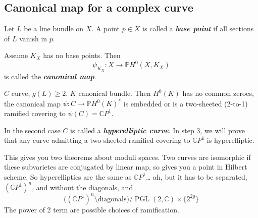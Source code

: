 \subsection{Canonical map for a complex curve}

\begin{defn}\leavevmode
	Let $L$ be a line bundle on $X$. A point $p \in X$ is called a \textit{\textbf{base point}} if all sections of $L$ vanish in $p$.
\end{defn}

\begin{defn}\leavevmode
	Assume $K_X$ has no base points. Then
	\[\psi_{K_X}:X\longrightarrow \mathbb{P}H^{0}(X,K_X)\]
	is called the \textit{\textbf{canonical map}}.
\end{defn}

\begin{thm}\leavevmode
	$C$ curve, $g(L)\geq 2$. $K$ canonical bundle. Then  $H^{0}(K)$ has no common zeroes, the canonical map $\psi:C\longrightarrow \mathbb{P}H^{0}(K)^*$ is embedded or is a two-sheeted (2-to-1) ramified covering to $ \psi(C)=\mathbb{C}P^{1}$.
\end{thm}

\begin{remark}
	In the second case $C$ is called a \textit{\textbf{hyperelliptic curve}}. In step 3, we will prove that any curve admitting a two sheeted ramified covering to  $\mathbb{C}P^{1}$ is hyperelliptic.

	This gives you two theorems about moduli spaces. Two curves are isomorphic if these subvarietes are conjugated by linear map, so gives you a point in Hilbert scheme. So hyperelliptics are the same as $\mathbb{C}P^{1}$… ah, but it has to be separated, $(\mathbb{C}P^{1})^n$, and without the diagonals, and 
	\[\Big((\mathbb{C}P^{1})^n\setminus \text{diagonals}\Big)\Big/\operatorname{PGL}(2,\mathbb{C})\times \{2^{2g}\} \]
	The power of 2 term are possible choices of ramification.
\end{remark}

